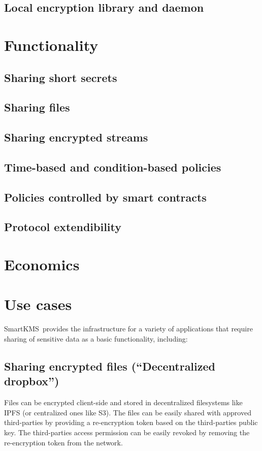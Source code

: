 \documentclass[notitlepage,longbibliography]{revtex4-1}
\newcommand{\kms}{SmartKMS}
\begin{document}
\subsection{Local encryption library and daemon}

\section{Functionality}

\subsection{Sharing short secrets}

\subsection{Sharing files}

\subsection{Sharing encrypted streams}

\subsection{Time-based and condition-based policies}

\subsection{Policies controlled by smart contracts}

\subsection{Protocol extendibility}

\section{Economics}

\section{Use cases}
\kms~provides the infrastructure for a variety of applications that require sharing of sensitive data as a basic
functionality, including:

\subsection{Sharing encrypted files (``Decentralized dropbox'')}
Files can be encrypted client-side and stored in decentralized filesystems like IPFS (or centralized ones like S3).
The files can be easily shared with approved third-parties by providing a re-encryption token based on the third-parties
public key.
The third-parties access permission can be easily revoked by removing the re-encryption token from the network.
\end{document}
